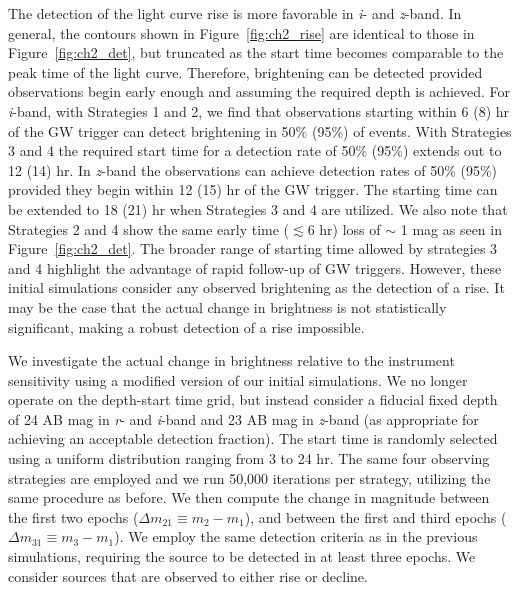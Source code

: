 The detection of the light curve rise is more favorable in {\em i}- and {\em z}-band. In general, the contours shown in Figure~\ref{fig:ch2_rise} are identical to those in Figure~\ref{fig:ch2_det}, but truncated as the start time becomes comparable to the peak time of the light curve. Therefore, brightening can be detected provided observations begin early enough and assuming the required depth is achieved. For {\em i}-band, with Strategies 1 and 2, we find that observations starting within 6 (8) hr of the GW trigger can detect brightening in 50\% (95\%) of events. With Strategies 3 and 4 the required start time for a detection rate of 50\% (95\%) extends out to 12 (14) hr. In {\em z}-band the observations can achieve detection rates of 50\% (95\%) provided they begin within 12 (15) hr of the GW trigger. The starting time can be extended to 18 (21) hr when Strategies 3 and 4 are utilized. We also note that Strategies 2 and 4 show the same early time ($\lesssim 6$ hr) loss of $\sim$ 1 mag as seen in Figure~\ref{fig:ch2_det}. The broader range of starting time allowed by strategies 3 and 4 highlight the advantage of rapid follow-up of GW triggers. However, these initial simulations consider any observed brightening as the detection of a rise. It may be the case that the actual change in brightness is not statistically significant, making a robust detection of a rise impossible.

We investigate the actual change in brightness relative to the instrument sensitivity using a modified version of our initial simulations. We no longer operate on the depth-start time grid, but instead consider a fiducial fixed depth of 24 AB mag in {\em r}- and {\em i}-band and 23 AB mag in {\em z}-band (as appropriate for achieving an acceptable detection fraction). The start time is randomly selected using a uniform distribution ranging from 3 to 24 hr. The same four observing strategies are employed and we run 50,000 iterations per strategy, utilizing the same procedure as before. We then compute the change in magnitude between the first two epochs ($\Delta m_{21} \equiv m_2 - m_1$), and between the first and third epochs ($\Delta m_{31} \equiv m_3 - m_1$). We employ the same detection criteria as in the previous simulations, requiring the source to be detected in at least three epochs. We consider sources that are observed to either rise or decline.

